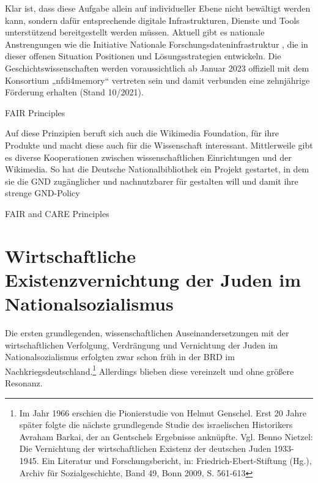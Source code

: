 Klar ist, dass diese Aufgabe allein auf individueller Ebene nicht bewältigt werden kann, sondern dafür entsprechende digitale Infrastrukturen, Dienste und Tools unterstützend bereitgestellt werden müssen. Aktuell gibt es nationale Anstrengungen wie die Initiative Nationale Forschungsdateninfrastruktur , die in dieser offenen Situation Positionen und Lösungsstrategien entwickeln. Die Geschichtswissenschaften werden voraussichtlich ab Januar 2023 offiziell mit dem Konsortium „nfdi4memory“ vertreten sein und damit verbunden eine zehnjährige Förderung erhalten (Stand 10/2021). 

FAIR Principles

Auf diese Prinzipien beruft sich auch die Wikimedia Foundation, für ihre Produkte und macht diese auch für die Wissenschaft interessant. Mittlerweile gibt es diverse Kooperationen zwischen wissenschaftlichen Einrichtungen und der Wikimedia. So hat die Deutsche Nationalbibliothek ein Projekt gestartet, in dem sie die GND zugänglicher und nachnutzbarer für gestalten will und damit ihre strenge GND-Policy

FAIR and CARE Principles

\section{Wirtschaftliche Existenzvernichtung der Juden im Nationalsozialismus}

Die ersten grundlegenden, wissenschaftlichen Auseinandersetzungen mit der wirtschaftlichen Verfolgung, Verdrängung und Vernichtung der Juden im Nationalsozialismus erfolgten zwar schon früh in der BRD im Nachkriegsdeutschland.\footnote{Im Jahr 1966 erschien die Pionierstudie von Helmut Genschel. Erst 20 Jahre später folgte die nächste grundlegende Studie des israelischen Historikers Avraham Barkai, der an Gentschels Ergebnisse anknüpfte. Vgl. Benno Nietzel: Die Vernichtung der wirtschaftlichen Existenz der deutschen Juden 1933-1945. Ein Literatur und Forschungsbericht, in: Friedrich-Ebert-Stiftung (Hg.), Archiv für Sozialgeschichte, Band 49, Bonn 2009, S. 561-613} Allerdings blieben diese vereinzelt und ohne größere Resonanz. 

